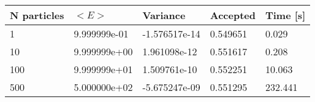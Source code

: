 \begin{table}[h!]
\begin{tabular}{|l|l|l|l|l|}
\hline 
N particles & $<E>$ & Variance & Accepted & Time [s]\\ 
 \hline 
1 & 9.999999e-01 & -1.576517e-14 & 0.549651 & 0.029 \\ \hline 
10 & 9.999999e+00 & 1.961098e-12 & 0.551617 & 0.208 \\ \hline 
100 & 9.999999e+01 & 1.509761e-10 & 0.552251 & 10.063 \\ \hline 
500 & 5.000000e+02 & -5.675247e-09 & 0.551295 & 232.441 \\ \hline 
\end{tabular}
\label{tab:hn2} 
\end{table} 
